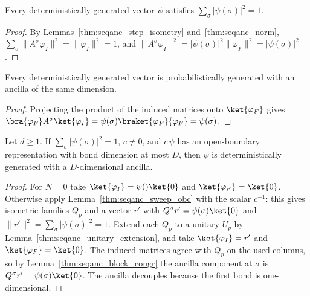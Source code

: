 \begin{lemma}
    \label{thm:seqanc_deterministic_norm}
    \leanok
    Every deterministically generated vector $\psi$ satisfies
    $\sum_\sigma|\psi(\sigma)|^2=1$.
\end{lemma}
\begin{proof}
    \leanok
    By Lemmas~\ref{thm:seqanc_step_isometry} and~\ref{thm:seqanc_norm},
    $\sum_\sigma\|A^\sigma\varphi_I\|^2=\|\varphi_I\|^2=1$, and
    $\|A^\sigma\varphi_I\|^2=|\psi(\sigma)|^2\|\varphi_F\|^2=|\psi(\sigma)|^2$.
\end{proof}

\begin{lemma}
    \label{thm:seqanc_deterministic_probabilistic}
    \leanok
    Every deterministically generated vector is probabilistically generated
    with an ancilla of the same dimension.
\end{lemma}
\begin{proof}
    \leanok
    Projecting the product of the induced matrices onto $\ket{\varphi_F}$ gives
    $\bra{\varphi_F}A^\sigma\ket{\varphi_I}
        =\psi(\sigma)\braket{\varphi_F}{\varphi_F}=\psi(\sigma)$.
\end{proof}

\begin{lemma}
    \label{thm:seqanc_obc_deterministic}
    \leanok
    Let $d\ge 1$. If $\sum_\sigma|\psi(\sigma)|^2=1$, $c\ne 0$, and
    $c\,\psi$ has an open-boundary representation with bond dimension at
    most $D$, then $\psi$ is deterministically generated with a
    $D$-dimensional ancilla.
\end{lemma}
\begin{proof}
    \leanok
    For $N=0$ take $\ket{\varphi_I}=\psi()\ket{0}$ and
    $\ket{\varphi_F}=\ket{0}$. Otherwise apply
    Lemma~\ref{thm:seqanc_sweep_obc} with the scalar $c^{-1}$: this gives
    isometric families $Q_p$ and a vector $r'$ with
    $Q^\sigma r'=\psi(\sigma)\ket{0}$ and $\|r'\|^2=\sum_\sigma|\psi(\sigma)|^2=1$.
    Extend each $Q_p$ to a unitary $U_p$ by
    Lemma~\ref{thm:seqanc_unitary_extension}, and take
    $\ket{\varphi_I}=r'$ and $\ket{\varphi_F}=\ket{0}$. The induced matrices
    agree with $Q_p$ on the used columns, so by
    Lemma~\ref{thm:seqanc_block_congr} the ancilla component at $\sigma$
    is $Q^\sigma r'=\psi(\sigma)\ket{0}$. The ancilla decouples because the
    first bond is one-dimensional.
\end{proof}

